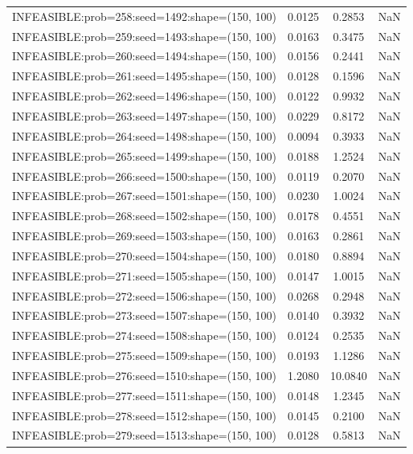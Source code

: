 \begin{longtable}{lccc}
INFEASIBLE:prob=258:seed=1492:shape=(150, 100) &   0.0125 &  0.2853 &    NaN \\
INFEASIBLE:prob=259:seed=1493:shape=(150, 100) &   0.0163 &  0.3475 &    NaN \\
INFEASIBLE:prob=260:seed=1494:shape=(150, 100) &   0.0156 &  0.2441 &    NaN \\
INFEASIBLE:prob=261:seed=1495:shape=(150, 100) &   0.0128 &  0.1596 &    NaN \\
INFEASIBLE:prob=262:seed=1496:shape=(150, 100) &   0.0122 &  0.9932 &    NaN \\
INFEASIBLE:prob=263:seed=1497:shape=(150, 100) &   0.0229 &  0.8172 &    NaN \\
INFEASIBLE:prob=264:seed=1498:shape=(150, 100) &   0.0094 &  0.3933 &    NaN \\
INFEASIBLE:prob=265:seed=1499:shape=(150, 100) &   0.0188 &  1.2524 &    NaN \\
INFEASIBLE:prob=266:seed=1500:shape=(150, 100) &   0.0119 &  0.2070 &    NaN \\
INFEASIBLE:prob=267:seed=1501:shape=(150, 100) &   0.0230 &  1.0024 &    NaN \\
INFEASIBLE:prob=268:seed=1502:shape=(150, 100) &   0.0178 &  0.4551 &    NaN \\
INFEASIBLE:prob=269:seed=1503:shape=(150, 100) &   0.0163 &  0.2861 &    NaN \\
INFEASIBLE:prob=270:seed=1504:shape=(150, 100) &   0.0180 &  0.8894 &    NaN \\
INFEASIBLE:prob=271:seed=1505:shape=(150, 100) &   0.0147 &  1.0015 &    NaN \\
INFEASIBLE:prob=272:seed=1506:shape=(150, 100) &   0.0268 &  0.2948 &    NaN \\
INFEASIBLE:prob=273:seed=1507:shape=(150, 100) &   0.0140 &  0.3932 &    NaN \\
INFEASIBLE:prob=274:seed=1508:shape=(150, 100) &   0.0124 &  0.2535 &    NaN \\
INFEASIBLE:prob=275:seed=1509:shape=(150, 100) &   0.0193 &  1.1286 &    NaN \\
INFEASIBLE:prob=276:seed=1510:shape=(150, 100) &   1.2080 & 10.0840 &    NaN \\
INFEASIBLE:prob=277:seed=1511:shape=(150, 100) &   0.0148 &  1.2345 &    NaN \\
INFEASIBLE:prob=278:seed=1512:shape=(150, 100) &   0.0145 &  0.2100 &    NaN \\
INFEASIBLE:prob=279:seed=1513:shape=(150, 100) &   0.0128 &  0.5813 &    NaN \\

\end{longtable}
